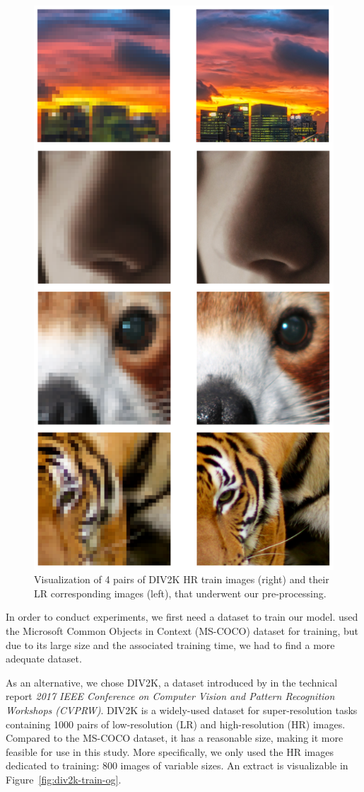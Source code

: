 \documentclass{article}
\begin{document}
{    \begin{figure}[ht]
        \centering
        \includegraphics[width=0.6 \textwidth]{images/DIV2K_HRLR.png}
        \caption{Visualization of 4 pairs of DIV2K HR train images (right) and their LR corresponding images (left), that underwent our pre-processing.}
        \label{fig:div2k-train-pair}
    \end{figure}

    In order to conduct experiments, we first need a dataset to train our model. \cite{sr} used the Microsoft Common Objects in Context (MS-COCO) dataset \citep{mscoco} for training, but due to its large size and the associated training time, we had to find a more adequate dataset.

    As an alternative, we chose DIV2K, a dataset introduced by \cite{div2k_ds} in the technical report \textit{2017 IEEE Conference on Computer Vision and Pattern Recognition Workshops (CVPRW)}. DIV2K is a widely-used dataset for super-resolution tasks containing 1000 pairs of low-resolution (LR) and high-resolution (HR) images. Compared to the MS-COCO dataset, it has a reasonable size, making it more feasible for use in this study. More specifically, we only used the HR images dedicated to training: 800 images of variable sizes. An extract is visualizable in Figure~\ref{fig:div2k-train-og}.

}
\end{document}
